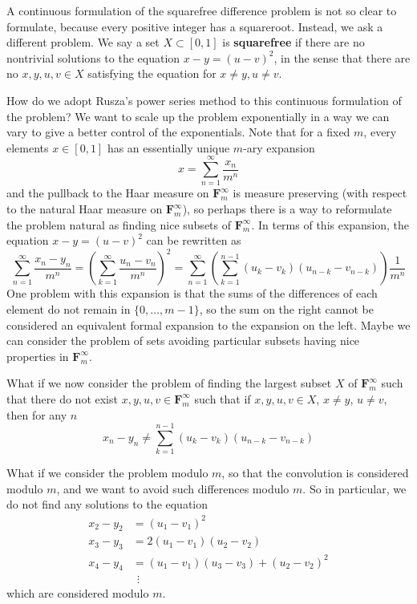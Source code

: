 \documentclass{article}
\theoremstyle{plain}
\theoremstyle{plain}
\begin{document}
A continuous formulation of the squarefree difference problem is not so clear to formulate, because every positive integer has a squareroot. Instead, we ask a different problem. We say a set $X \subset [0,1]$ is {\bf squarefree} if there are no nontrivial solutions to the equation $x - y = (u - v)^2$, in the sense that there are no $x,y,u,v \in X$ satisfying the equation for $x \neq y, u \neq v$.

How do we adopt Rusza's power series method to this continuous formulation of the problem? We want to scale up the problem exponentially in a way we can vary to give a better control of the exponentials. Note that for a fixed $m$, every elements $x \in [0,1]$ has an essentially unique $m$-ary expansion
%
\[ x = \sum_{n = 1}^\infty \frac{x_n}{m^n} \]
%
and the pullback to the Haar measure on $\mathbf{F}_m^\infty$ is measure preserving (with respect to the natural Haar measure on $\mathbf{F}_m^\infty$), so perhaps there is a way to reformulate the problem natural as finding nice subsets of $\mathbf{F}_m^\infty$. In terms of this expansion, the equation $x - y = (u - v)^2$ can be rewritten as
%
\[ \sum_{n = 1}^\infty \frac{x_n - y_n}{m^n} = \left( \sum_{k = 1}^\infty \frac{u_n - v_n}{m^n} \right)^2 = \sum_{n = 1}^\infty \left( \sum_{k = 1}^{n-1} (u_k - v_k)(u_{n-k} - v_{n-k}) \right) \frac{1}{m^n} \]
%
One problem with this expansion is that the sums of the differences of each element do not remain in $\{ 0, \dots, m-1 \}$, so the sum on the right cannot be considered an equivalent formal expansion to the expansion on the left. Maybe we can consider the problem of sets avoiding particular subsets having nice properties in $\mathbf{F}_m^\infty$.

What if we now consider the problem of finding the largest subset $X$ of $\mathbf{F}_m^\infty$ such that there do not exist $x,y,u,v \in \mathbf{F}_m^\infty$ such that if $x,y,u,v \in X$, $x \neq y$, $u \neq v$, then for any $n$
%
\[ x_n - y_n \neq \sum_{k = 1}^{n-1} (u_k - v_k)(u_{n-k} - v_{n-k}) \]

What if we consider the problem modulo $m$, so that the convolution is considered modulo $m$, and we want to avoid such differences modulo $m$. So in particular, we do not find any solutions to the equation
%
\begin{align*}
    x_2 - y_2 &= (u_1 - v_1)^2\\
    x_3 - y_3 &= 2 (u_1 - v_1)(u_2 - v_2)\\
    x_4 - y_4 &= (u_1 - v_1)(u_3 - v_3) + (u_2 - v_2)^2\\
    &\ \ \vdots
\end{align*}
%
which are considered modulo $m$.
\end{document}
